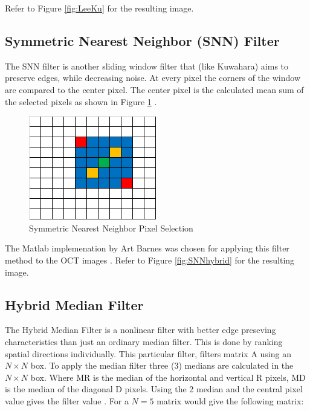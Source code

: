 \documentclass{article}
\begin{document}
Refer to Figure \ref{fig:LeeKu} for the resulting image.

\subsection{\label{sec:level2} Symmetric Nearest Neighbor (SNN) Filter}

The SNN filter is another sliding window filter that (like Kuwahara) aims to preserve edges, while decreasing noise. At every pixel the corners of the window are compared to the center pixel. The center pixel is the calculated mean sum of the selected pixels as shown in Figure \ref{fig:snn} \cite{fiveko_symmetric_2017}.

\begin{figure}
  \centering
  \includegraphics[width=0.5\linewidth]{Figures/snn}
  \caption{Symmetric Nearest Neighbor Pixel Selection \cite{fiveko_symmetric_2017}}
  \label{fig:snn}
\end{figure}

The Matlab implemenation by Art Barnes was chosen for applying this filter method to the OCT images \cite{barnes_snn_2005}. Refer to Figure \ref{fig:SNNhybrid} for the resulting image.
\subsection{\label{sec:level2} Hybrid Median Filter}
The Hybrid Median Filter is a nonlinear filter with better edge preseving characteristics than just an ordinary median filter. This is done by ranking spatial directions individually. This particular filter, filters matrix A using an $N \times N$ box. To apply the median filter three (3) medians are calculated in the $N \times N$ box. Where MR is the median of the horizontal and vertical R pixels, MD is the median of the diagonal D pixels. Using the 2 median and the central pixel value gives the filter value \cite{rabie_adaptive_2004}. For a $N=5$ matrix would give the following matrix:
\end{document}
